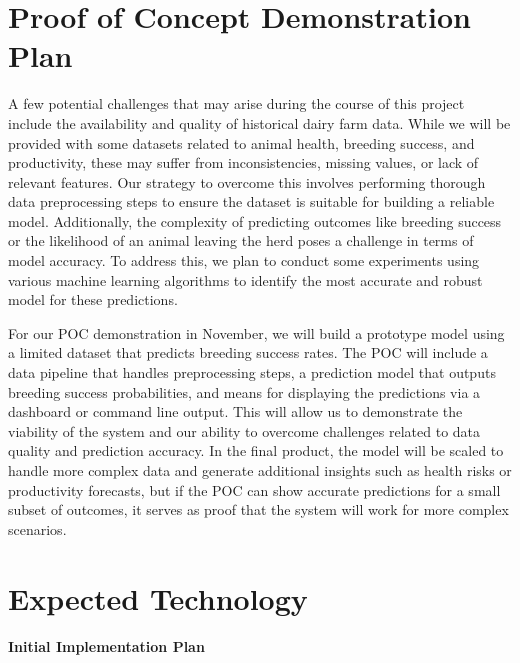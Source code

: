 \documentclass{article}
\begin{document}
\section{Proof of Concept Demonstration Plan}

A few potential challenges that may arise during the course of this project
include the availability and quality of historical dairy farm data. While we
will be provided with some datasets related to animal health, breeding success,
and productivity, these may suffer from inconsistencies, missing values, or lack
of relevant features. Our strategy to overcome this involves performing thorough
data preprocessing steps to ensure the dataset is suitable for building a
reliable model. Additionally, the complexity of predicting outcomes like
breeding success or the likelihood of an animal leaving the herd poses a
challenge in terms of model accuracy. To address this, we plan to conduct some
experiments using various machine learning algorithms to identify the most
accurate and robust model for these predictions.

For our POC demonstration in November, we will build a prototype model using a
limited dataset that predicts breeding success rates. The POC will include a
data pipeline that handles preprocessing steps, a prediction model that outputs
breeding success probabilities, and means for displaying the predictions via a
dashboard or command line output. This will allow us to demonstrate the
viability of the system and our ability to overcome challenges related to data
quality and prediction accuracy. In the final product, the model will be scaled
to handle more complex data and generate additional insights such as health
risks or productivity forecasts, but if the POC can show accurate predictions
for a small subset of outcomes, it serves as proof that the system will work for
more complex scenarios.

\section{Expected Technology}
\textbf{Initial Implementation Plan}
\end{document}
